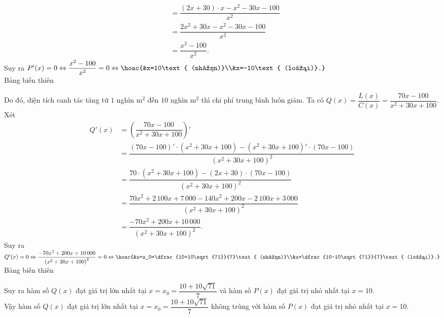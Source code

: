 \begin{ex}
{\begin{itemchoice}
\begin{align*}
				&=\dfrac{(2x+30)\cdot x-x^2-30x-100}{x^2}\\
				&=\dfrac{2x^2+30x-x^2-30x-100}{x^2}\\
				&=\dfrac{x^2-100}{x^2}.
			\end{align*}
			Suy ra $P'(x)=0\Leftrightarrow\dfrac{x^2-100}{x^2}=0\Leftrightarrow\hoac{&x=10\text{ (nhận)}\\&x=-10\text{ (loại)}.}$\\
			Bảng biến thiên
			\begin{center}
			\end{center}
			Do đó, diện tích canh tác tăng từ $1$ nghìn m$^2$ đến $10$ nghìn m$^2$ thì chi phí trung bình luôn giảm.
			\itemch Ta có $Q(x)=\dfrac{L(x)}{C(x)}=\dfrac{70x-100}{x^2+30x+100}$.\\
			Xét 
			\allowdisplaybreaks
			\begin{align*}
				Q'(x)&=\left(\dfrac{70x-100}{x^2+30x+100}\right)'\\
				&=\dfrac{(70x-100)'\cdot\left(x^2+30x+100\right)-\left(x^2+30x+100\right)'\cdot(70x-100)}{\left(x^2+30x+100\right)^2}\\
				&=\dfrac{70\cdot\left(x^2+30x+100\right)-(2x+30)\cdot(70x-100)}{\left(x^2+30x+100\right)^2}\\
				&=\dfrac{70x^2+2\,100x+7\,000-140x^2+200x-2\,100x+3\,000}{\left(x^2+30x+100\right)^2}\\
				&=\dfrac{-70x^2+200x+10\,000}{\left(x^2+30x+100\right)^2}.
			\end{align*}
			Suy ra $Q'(x)=0\Leftrightarrow\dfrac{-70x^2+200x+10\,000}{\left(x^2+30x+100\right)^2}=0\Leftrightarrow\hoac{&x=x_0=\dfrac{10+10\sqrt{71}}{7}\text{ (nhận)}\\&x=\dfrac{10-10\sqrt{71}}{7}\text{ (loại)}.}$\\
			Bảng biến thiên
			\begin{center}
			\end{center}
			Suy ra hàm số $Q(x)$ đạt giá trị lớn nhất tại $x=x_0=\dfrac{10+10\sqrt{71}}{7}$ và hàm số $P(x)$ đạt giá trị nhỏ nhất tại $x=10$.\\
			Vậy hàm số $Q(x)$ đạt giá trị lớn nhất tại $x=x_0=\dfrac{10+10\sqrt{71}}{7}$ không trùng với hàm số $P(x)$ đạt giá trị nhỏ nhất tại $x=10$.
		\end{itemchoice}
	}
\end{ex}

